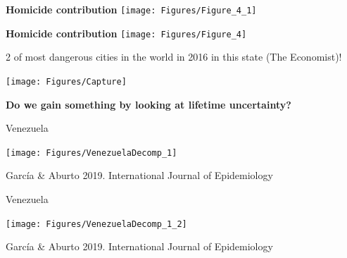 \documentclass[xcolor={dvipsnames}]{beamer}
\begin{document}
\begin{frame}
	\begin{center}
		\Large{\textbf{Homicide contribution}}
		\texttt{[image: Figures/Figure\_4\_1]}
	\end{center}

\end{frame}

\begin{frame}
	\begin{center}
		\Large{\textbf{Homicide contribution}}
		\texttt{[image: Figures/Figure\_4]}
	\end{center}

\end{frame}



\begin{frame}

\Large{
2 of most dangerous cities in the world in 2016 in this state (The Economist)!

				\begin{center}
		\texttt{[image: Figures/Capture]}
				\end{center}				

}
\end{frame}

\begin{frame}
\LARGE{
\begin{center}
\textbf{Do we gain something by looking at lifetime uncertainty?}
\end{center}
}
\end{frame}


\begin{frame}
	\begin{center}
		\Large{Venezuela}
	\end{center}

	\hspace*{-1cm}   
	\texttt{[image: Figures/VenezuelaDecomp\_1]}	

\tiny{Garc\'ia \& Aburto 2019. International Journal of Epidemiology}
\end{frame}

\begin{frame}
	\begin{center}
		\Large{Venezuela}
	\end{center}

	\hspace*{-1cm}   
	\texttt{[image: Figures/VenezuelaDecomp\_1\_2]}	
	
\tiny{Garc\'ia \& Aburto 2019. International Journal of Epidemiology}
\end{frame}
\end{document}
